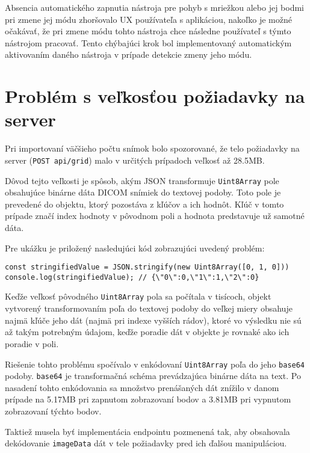Absencia automatického zapnutia nástroja pre pohyb s mriežkou alebo jej bodmi pri zmene jej módu zhoršovalo UX používateľa s aplikáciou, nakoľko je možné očakávať, že pri zmene módu tohto nástroja chce následne používateľ s týmto nástrojom pracovať. Tento chýbajúci krok bol implementovaný automatickým aktivovaním daného nástroja v prípade detekcie zmeny jeho módu.

\section {Problém s veľkosťou požiadavky na server}
Pri importovaní väčšieho počtu snímok bolo spozorované, že telo požiadavky na server (\texttt{POST api/grid}) malo v určitých prípadoch veľkosť až 28.5MB.

Dôvod tejto veľkosti je spôsob, akým JSON transformuje \texttt{Uint8Array} pole obsahujúce binárne dáta DICOM snímiek do textovej podoby. Toto pole je prevedené do objektu, ktorý pozostáva z kľúčov a ich hodnôt. Kľúč v tomto prípade značí index hodnoty v pôvodnom poli a hodnota predstavuje už samotné dáta.

\clearpage

Pre ukážku je priložený nasledujúci kód zobrazujúci uvedený problém:

\begin{minipage}[]{\linewidth}
\begin{verbatim}
const stringifiedValue = JSON.stringify(new Uint8Array([0, 1, 0]))
console.log(stringifiedValue); // {\"0\":0,\"1\":1,\"2\":0}
\end{verbatim}
\end{minipage}

Keďže veľkosť pôvodného \texttt{Uint8Array} pola sa počítala v tisícoch, objekt vytvorený transformovaním poľa do textovej podoby do veľkej miery obsahuje najmä kľúče jeho dát (najmä pri indexe vyšších rádov), ktoré vo výsledku nie sú až takým potrebným údajom, keďže poradie dát v objekte je rovnaké ako ich poradie v poli.

Riešenie tohto problému spočívalo v enkódovaní \texttt{Uint8Array} poľa do jeho \texttt{base64} podoby. \texttt{base64} je transformačná schéma prevádzajúca binárne dáta na text. Po nasadení tohto enkódovania sa množstvo prenášaných dát znížilo v danom prípade na 5.17MB pri zapnutom zobrazovaní  bodov a 3.81MB pri vypnutom zobrazovaní týchto bodov.

Taktiež musela byť implementácia endpointu pozmenená tak, aby obsahovala dekódovanie \texttt{imageData} dát v tele požiadavky pred ich ďalšou manipuláciou.